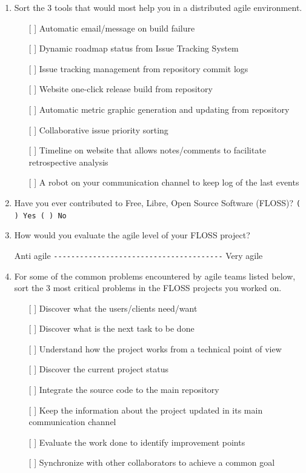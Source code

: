 \documentclass[lnbip]{svmultln}
\begin{document}
\begin{enumerate}
\item Sort the 3 tools that would most help you in a distributed agile
  environment.
  \begin{itemize}
  \item[[ ] ] Automatic email/message on build failure
  \item[[ ] ] Dynamic roadmap status from Issue Tracking System
  \item[[ ] ] Issue tracking management from repository commit logs
  \item[[ ] ] Website one-click release build from repository
  \item[[ ] ] Automatic metric graphic generation and updating from
    repository
  \item[[ ] ] Collaborative issue priority sorting
  \item[[ ] ] Timeline on website that allows notes/comments to
    facilitate retrospective analysis
  \item[[ ] ] A robot on your communication channel to keep log of the
    last events
  \end{itemize}
\vspace{10pt}

\item Have you ever contributed to Free, Libre, Open Source Software
  (FLOSS)?  \verb=( ) Yes ( ) No= \vspace{10pt}

\item How would you evaluate the agile level of your FLOSS project?

  Anti agile \verb=---------------------------------------= Very agile
  \vspace{10pt}

\item For some of the common problems encountered by agile teams
  listed below, sort the 3 most critical problems in the FLOSS
  projects you worked on.
  \begin{itemize}
  \item[[ ] ] Discover what the users/clients need/want
  \item[[ ] ] Discover what is the next task to be done
  \item[[ ] ] Understand how the project works from a technical point
    of view
  \item[[ ] ] Discover the current project status
  \item[[ ] ] Integrate the source code to the main repository
  \item[[ ] ] Keep the information about the project updated in its
    main communication channel
  \item[[ ] ] Evaluate the work done to identify improvement points
  \item[[ ] ] Synchronize with other collaborators to achieve a common
    goal
  \end{itemize}
  \vspace{10pt}


\end{enumerate}
\end{document}
